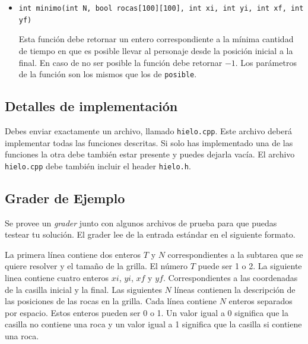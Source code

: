 \documentclass{oci}
\begin{document}
\begin{itemize}
	\item \verb+int minimo(int N, bool rocas[100][100], int xi, int yi, int xf, int yf)+

	Esta función debe retornar un entero correspondiente a la mínima cantidad de tiempo en que es posible llevar al personaje desde la posición inicial a la final.
  En caso de no ser posible la función debe retornar $-1$.
  Los parámetros de la función son los mismos que los de \verb+posible+.
\end{itemize}

\subsection*{Detalles de implementación}
Debes enviar exactamente un archivo, llamado \verb+hielo.cpp+.
Este archivo deberá implementar todas las funciones descritas.
Si solo has implementado una de las funciones la otra debe también estar presente y puedes dejarla vacía.
El archivo \verb+hielo.cpp+ debe también incluir el header \verb+hielo.h+.

\subsection*{Grader de Ejemplo}
Se provee un \emph{grader} junto con algunos archivos de prueba para que puedas testear tu solución.
El grader lee de la entrada estándar en el siguiente formato.

La primera línea contiene dos enteros $T$ y $N$ correspondientes a la subtarea que se quiere resolver y el tamaño de la grilla.
El número $T$ puede ser 1 o 2.
La siguiente linea contiene cuatro enteros $xi$, $yi$, $xf$ y $yf$.
Correspondientes a las coordenadas de la casilla inicial y la final.
Las siguientes $N$ líneas contienen la descripción de las posiciones de las rocas en la grilla.
Cada línea contiene $N$ enteros separados por espacio.
Estos enteros pueden ser 0 o 1.
Un valor igual a 0 significa que la casilla no contiene una roca y un valor igual a 1 significa que la casilla si contiene una roca.
\end{document}
